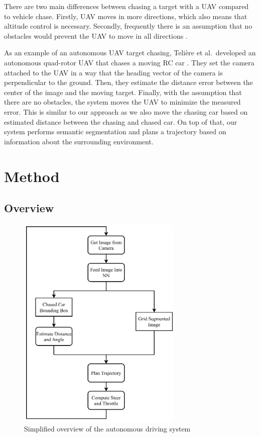 \documentclass{ctuthesis/ctuthesis}
\begin{document}
There are two main differences between chasing a target with a UAV compared to vehicle chase. Firstly, UAV moves in more directions, which also means that altitude control is necessary. Secondly, frequently there is an assumption that no obstacles would prevent the UAV to move in all directions \cite{target_following_alg,uva_tracking_formula,rotorcraft}. \par


As an example of an autonomous UAV target chasing, Telière et al.\ developed an autonomous quad-rotor UAV that chases a moving RC car \cite{uva_tracking_formula}. They set the camera attached to the UAV in a way that the heading vector of the camera is perpendicular to the ground. Then, they estimate the distance error between the center of the image and the moving target. Finally, with the assumption that there are no obstacles, the system moves the UAV to minimize the measured error. This is similar to our approach as we also move the chasing car based on estimated distance between the chasing and chased car. On top of that, our system performs semantic segmentation and plans a trajectory based on information about the surrounding environment. 



\chapter{Method}\label{s:method}
\section{Overview}
\begin{figure}[]
    \centering
    \includegraphics[width=0.7\textwidth]{images/bachelor_diagram.pdf}
    \caption{Simplified overview of the autonomous driving system}\label{f:overview}
\end{figure}
\end{document}

